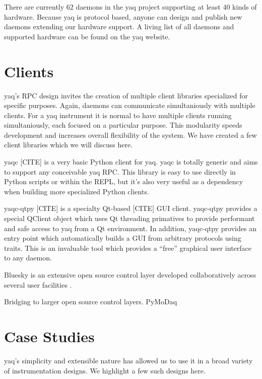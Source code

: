 \documentclass{article}
\begin{document}
There are currently 62 daemons in the yaq project supporting at least 40 kinds of hardware.
Because yaq is protocol based, anyone can design and publish new daemons extending our hardware support.
A living list of all daemons and supported hardware can be found on the yaq website.



\section{Clients}

yaq's RPC design invites the creation of multiple client libraries specialized for specific purposes.
Again, daemons can communicate simultaniously with multiple clients.
For a yaq instrument it is normal to have multiple clients running simultaniously, each focused on a particular purpose.
This modularity speeds development and increases overall flexibility of the system.
We have created a few client libraries which we will discuss here.

yaqc [CITE] is a very basic Python client for yaq.
yaqc is totally generic and aims to support any conceivable yaq RPC.
This library is easy to use directly in Python scripts or within the REPL, but it's also very useful as a dependency when building more specialized Python clients.

yaqc-qtpy [CITE] is a specialty Qt-based [CITE] GUI client.
yaqc-qtpy provides a special QClient object which uses Qt threading primatives to provide performant and safe access to yaq from a Qt environment.
In addition, yaqc-qtpy provides an entry point which automatically builds a GUI from arbitrary protocols using traits.
This is an invaluable tool which provides a ``free'' graphical user interface to any daemon.

Bluesky is an extensive open source control layer developed collaboratively across several user facilities \cite{AllanDanielB2019a}.

Bridging to larger open source control layers.
PyMoDaq \cite{WeberSebastien2021a}

\section{Case Studies}

yaq's simplicity and extensible nature has allowed us to use it in a broad variety of instrumentation designs.
We highlight a few such designs here.
\end{document}
